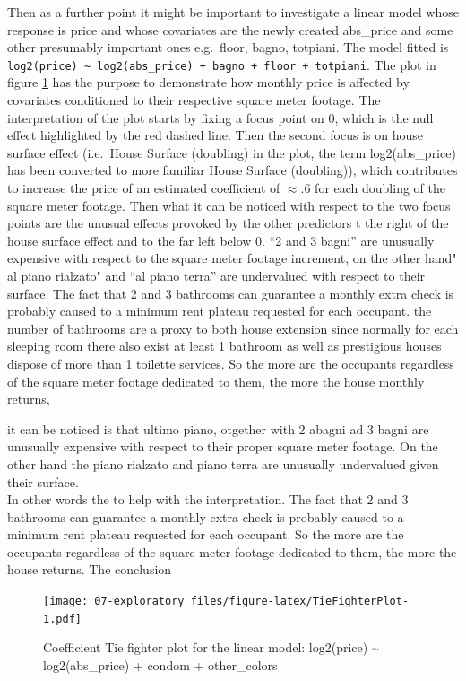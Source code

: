 \documentclass[
  12pt,
  a4paper,
  oneside]{book}
\theoremstyle{definition}
\theoremstyle{definition}
\theoremstyle{definition}
\theoremstyle{remark}
\begin{document}
Then as a further point it might be important to investigate a linear model whose response is price and whose covariates are the newly created abs\_price and some other presumably important ones e.g.~floor, bagno, totpiani. The model fitted is \texttt{log2(price)\ \textasciitilde{}\ log2(abs\_price)\ +\ bagno\ +\ floor\ +\ totpiani}.
The plot in figure \ref{fig:TieFighterPlot} has the purpose to demonstrate how monthly price is affected by covariates conditioned to their respective square meter footage. The interpretation of the plot starts by fixing a focus point on 0, which is the null effect highlighted by the red dashed line. Then the second focus is on house surface effect (i.e.~House Surface (doubling) in the plot, the term log2(abs\_price) has been converted to more familiar House Surface (doubling)), which contributes to increase the price of an estimated coefficient of \(\approx .6\) for each doubling of the square meter footage. Then what it can be noticed with respect to the two focus points are the unusual effects provoked by the other predictors t the right of the house surface effect and to the far left below 0. ``2 and 3 bagni'' are unusually expensive with respect to the square meter footage increment, on the other hand" al piano rialzato" and ``al piano terra'' are undervalued with respect to their surface. The fact that 2 and 3 bathrooms can guarantee a monthly extra check is probably caused to a minimum rent plateau requested for each occupant. the number of bathrooms are a proxy to both house extension since normally for each sleeping room there also exist at least 1 bathroom as well as prestigious houses dispose of more than 1 toilette services. So the more are the occupants regardless of the square meter footage dedicated to them, the more the house monthly returns,

it can be noticed is that ultimo piano, otgether with 2 abagni ad 3 bagni are unusually expensive with respect to their proper square meter footage. On the other hand the piano rialzato and piano terra are unusually undervalued given their surface.\\
In other words the to help with the interpretation. The fact that 2 and 3 bathrooms can guarantee a monthly extra check is probably caused to a minimum rent plateau requested for each occupant. So the more are the occupants regardless of the square meter footage dedicated to them, the more the house returns. The conclusion

\begin{figure}
\centering
\texttt{[image: 07-exploratory\_files/figure-latex/TieFighterPlot-1.pdf]}
\caption{\label{fig:TieFighterPlot}Coefficient Tie fighter plot for the linear model: log2(price) \textasciitilde{} log2(abs\_price) + condom + other\_colors}
\end{figure}
\end{document}
